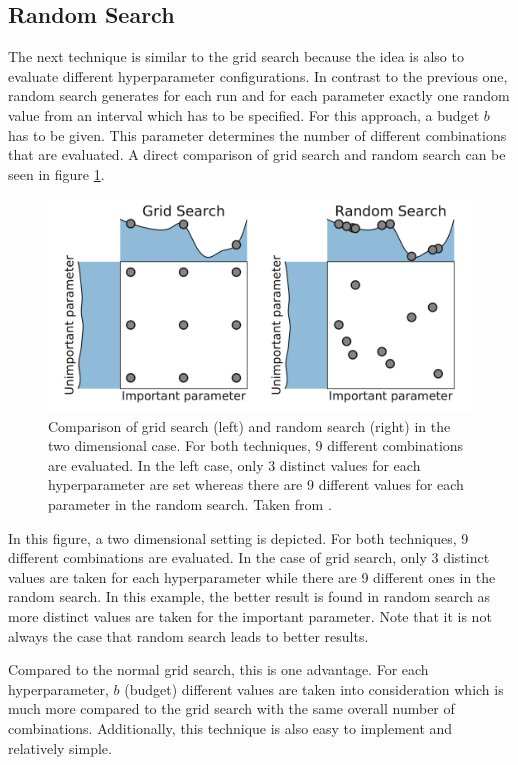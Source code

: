 \subsection{Random Search}
The next technique \cite{random_search} is similar to the grid search because the idea is also to evaluate different hyperparameter configurations. In contrast to the previous one, random search generates for each run and for each parameter exactly one random value from an interval which has to be specified. For this approach, a budget $ b $ has to be given. This parameter determines the number of different combinations that are evaluated. A direct comparison of grid search and random search can be seen in figure \ref{fig:comparison_searches}.

\begin{figure}[hbtp!]
	\centering
	\includegraphics[scale=0.2]{figures/comparison_searches.png}
	\caption{Comparison of grid search (left) and random search (right) in the two dimensional case. For both techniques, 9 different combinations are evaluated. In the left case, only 3 distinct values for each hyperparameter are set whereas there are 9 different values for each parameter in the random search. Taken from \cite{feurer2019hyperparameter}. }
	\label{fig:comparison_searches}
\end{figure}

In this figure, a two dimensional setting is depicted. For both techniques, 9 different combinations are evaluated. In the case of grid search, only 3 distinct values are taken for each hyperparameter while there are 9 different ones in the random search. In this example, the better result is found in random search as more distinct values are taken for the important parameter. Note that it is not always the case that random search leads to better results.

Compared to the normal grid search, this is one advantage. For each hyperparameter, $ b $ (budget) different values are taken into consideration which is much more compared to the grid search with the same overall number of combinations. Additionally, this technique is also easy to implement and relatively simple. 

